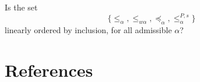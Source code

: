 \documentclass[12pt]{article}
\numberwithin{equation}{section}
\begin{document}
\begin{ques}
Is the set 
\begin{equation*}
    \{\leq_{\alpha}, \leq_{w \alpha}, \preceq_{\alpha}, \leq^{P, s}_{\alpha}\}
\end{equation*}
linearly ordered by inclusion, for all admissible $\alpha$?
\end{ques}

\section{References}
\printbibliography[heading=none]
\end{document}
